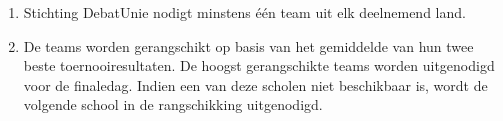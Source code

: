 
\begin{enumerate}
\item Stichting DebatUnie nodigt minstens één team uit elk deelnemend land.
\item De teams worden gerangschikt op basis van het gemiddelde van hun twee beste toernooiresultaten. De hoogst gerangschikte teams worden uitgenodigd voor de finaledag. Indien een van deze scholen niet beschikbaar is, wordt de volgende school in de rangschikking uitgenodigd.
\end{enumerate}